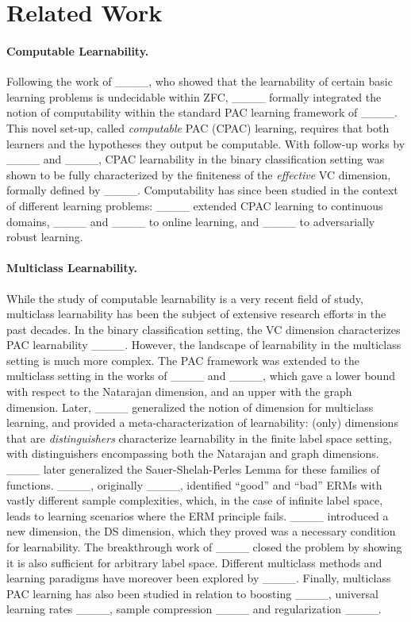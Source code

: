 \section{Related Work}
\paragraph{Computable Learnability.}
Following the work of ____, who showed that the learnability of certain basic learning problems is undecidable within ZFC, ____ formally integrated the notion of computability within the standard PAC learning framework of ____.
This novel set-up,  called \emph{computable} PAC (CPAC) learning, requires that both learners and the hypotheses they output be computable.
With follow-up works by ____ and ____, CPAC learnability in the binary classification setting was shown to be fully characterized by the finiteness of the \emph{effective} VC dimension, formally defined by ____.
Computability has since been studied in the context of different learning problems: ____ extended CPAC learning to continuous domains, ____ and ____ to online learning, and  ____ to adversarially robust learning.


\paragraph{Multiclass Learnability.}
While the study of computable learnability is a very recent field of study, multiclass learnability has been the subject of extensive research efforts in the past decades.
In the binary classification setting, the VC dimension characterizes PAC learnability ____.
However, the landscape of learnability in the multiclass setting is much more complex.
The PAC framework was extended to the multiclass setting in the works of ____ and ____, which gave a lower bound with respect to the Natarajan dimension, and an upper with the graph dimension.
Later, ____ generalized the notion of dimension for multiclass learning, and provided a meta-characterization of learnability: (only) dimensions that are \emph{distinguishers} characterize learnability in the finite label space setting, with distinguishers encompassing both the Natarajan and graph dimensions.
____ later generalized the Sauer-Shelah-Perles Lemma for these families of functions.
____, originally ____, identified ``good'' and ``bad'' ERMs with vastly different sample complexities, which, in the case of infinite label space, leads to learning scenarios where the ERM principle fails.
____ introduced a new dimension, the DS dimension, which they proved was a necessary condition for learnability. 
The breakthrough work of ____ closed the problem by showing it is also sufficient for arbitrary label space.
Different multiclass methods and learning paradigms have moreover been explored by ____.
Finally, multiclass PAC learning has also been studied in relation to boosting ____, universal learning rates ____, sample compression  ____ and regularization ____.